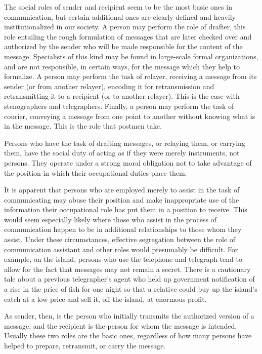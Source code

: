 \documentclass[openany,nobib]{tufte-book}
\begin{document}
The social roles of sender and recipient seem to be the most basic ones
in communication, but certain additional ones are clearly defined and
heavily institutionalized in our society. A person may perform the role
of drafter, this role entailing the rough formulation of messages that
are later checked over and authorized by the sender who will be made
responsible for the content of the message. Specialists of this kind may
be found in large-scale formal organizations, and are not responsible,
in certain ways, for the message which they help to formalize. A person
may perform the task of relayer, receiving a message from its sender (or
from another relayer), encoding it for retransmission and retransmitting
it to a recipient (or to another relayer). This is the case with
stenographers and telegraphers. Finally, a person may perform the task
of courier, conveying a message from one point to another without
knowing what is in the message. This is the role that postmen take.

Persons who have the task of drafting messages, or relaying them, or
carrying them, have the social duty of acting as if they were merely
instruments, not persons. They operate under a strong moral obligation
not to take advantage of the position in which their occupational duties
place them.

It is apparent that persons who are employed merely to assist in the
task of communicating may abuse their position and make inappropriate
use of the information their occupational role has put them in a
position to receive. This would seem especially likely where those who
assist in the process of communication happen to be in additional
relationships to those whom they assist. Under these circumstances,
effective segregation between the role of communication assistant and
other roles would presumably be difficult. For example, on the island,
persons who use the telephone and telegraph tend to allow for the fact
that messages may not remain a secret. There is a cautionary tale about
a previous telegrapher's agent who held up government notification of a
rise in the price of fish for one night so that a relative could buy up
the island's catch at a low price and sell it, off the island, at
enormous profit.

As sender, then, is the person who initially transmits the authorized
version of a message, and the recipient is the person for whom the
message is intended. Usually these two roles are the basic ones,
regardless of how many persons have helped to prepare, retransmit, or
carry the message.
\end{document}
